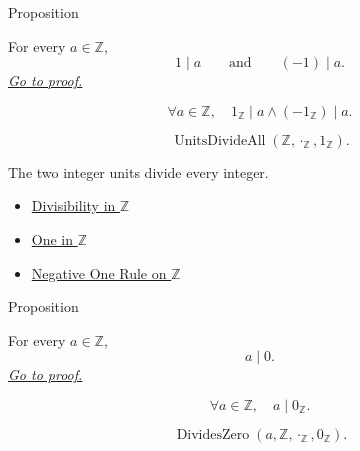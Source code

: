 \begin{propositionbox}{Proposition}
\begin{proposition}
\label{prop:units-divide-everything-on-z}
For every $a\in\mathbb{Z}$,
\[
1\mid a
\qquad\text{and}\qquad
(-1)\mid a.
\]
\hyperref[prf:units-divide-everything-on-z]{\textit{Go to proof.}}
\end{proposition}
\end{propositionbox}

\begin{remark*}
\[
\forall a\in\mathbb{Z},\quad 1_{\mathbb{Z}}\mid a\land (-1_{\mathbb{Z}})\mid a.
\]
\end{remark*}

\begin{remark*}
\[
\operatorname{UnitsDivideAll}(\mathbb{Z},\cdot_{\mathbb{Z}},1_{\mathbb{Z}}).
\]
\end{remark*}

\begin{remark*}[Interpretation]
The two integer units divide every integer.
\end{remark*}

\begin{dependencies}
\begin{itemize}
  \item \hyperref[def:divisibility-in-z]{Divisibility in $\mathbb{Z}$}
  \item \hyperref[def:one-in-z]{One in $\mathbb{Z}$}
  \item \hyperref[cor:negative-one-rule-on-z]{Negative One Rule on $\mathbb{Z}$}
\end{itemize}
\end{dependencies}

\begin{propositionbox}{Proposition}
\begin{proposition}
\label{prop:everything-divides-zero-on-z}
For every $a\in\mathbb{Z}$,
\[
a\mid 0.
\]
\hyperref[prf:everything-divides-zero-on-z]{\textit{Go to proof.}}
\end{proposition}
\end{propositionbox}

\begin{remark*}
\[
\forall a\in\mathbb{Z},\quad a\mid0_{\mathbb{Z}}.
\]
\end{remark*}

\begin{remark*}
\[
\operatorname{DividesZero}(a,\mathbb{Z},\cdot_{\mathbb{Z}},0_{\mathbb{Z}}).
\]
\end{remark*}

